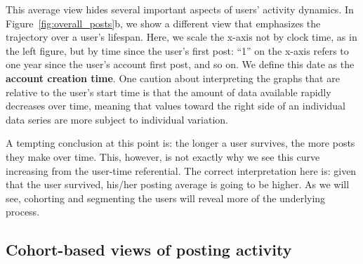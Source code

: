 This average view hides several important aspects of users' activity dynamics.  In Figure~\ref{fig:overall_posts}b, we show a different view that emphasizes the trajectory over a user's lifespan.  Here, we scale the x-axis not by clock time, as in the left figure, but by time since the user's first post: ``1'' on the x-axis refers to one year since the user's account first post, and so on. We define this date as the \textbf{account creation time}.
One caution about interpreting the graphs that are relative to the user's start time is that the amount of data available rapidly decreases over time, meaning that values toward the right side of an individual data series are more subject to individual variation.  



A tempting conclusion at this point is: the longer a user survives, the more posts they make over time. This, however, is not exactly why we see this curve increasing from the user-time referential. The correct interpretation here is: given that the user survived, his/her posting average is going to be higher. As we will see, cohorting and segmenting the users will reveal more of the underlying process. 


\subsection{Cohort-based views of posting activity}

